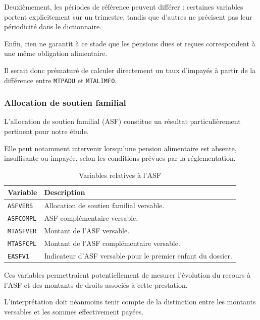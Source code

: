 \documentclass[11pt,a4paper]{article}
\begin{document}
Deuxièmement, les périodes de référence
peuvent différer : certaines variables
portent explicitement sur un trimestre,
tandis que d'autres ne précisent
pas leur périodicité dans le dictionnaire.

Enfin, rien ne garantit à ce stade
que les pensions dues et reçues
correspondent à une même obligation
alimentaire.

Il serait donc prématuré de calculer
directement un taux d'impayés
à partir de la différence entre
\texttt{MTPADU} et
\texttt{MTALIMFO}.

\subsubsection{Allocation de soutien familial}

L'allocation de soutien familial (ASF)
constitue un résultat particulièrement
pertinent pour notre étude.

Elle peut notamment intervenir
lorsqu'une pension alimentaire
est absente, insuffisante
ou impayée, selon les conditions
prévues par la réglementation.

\begin{table}[H]
\centering
\caption{Variables relatives à l'ASF}
\small
\begin{tabular}{p{2.4cm}p{10.6cm}}
\toprule
\textbf{Variable} & \textbf{Description} \\
\midrule
\texttt{ASFVERS} &
Allocation de soutien familial versable. \\

\texttt{ASFCOMPL} &
ASF complémentaire versable. \\

\texttt{MTASFVER} &
Montant de l'ASF versable. \\

\texttt{MTASFCPL} &
Montant de l'ASF complémentaire versable. \\

\texttt{EASFV1} &
Indicateur d'ASF versable pour
le premier enfant du dossier. \\
\bottomrule
\end{tabular}
\end{table}

Ces variables permettraient
potentiellement de mesurer
l'évolution du recours à l'ASF
et des montants de droits
associés à cette prestation.

L'interprétation doit néanmoins
tenir compte de la distinction
entre les montants versables
et les sommes effectivement payées.
\end{document}
